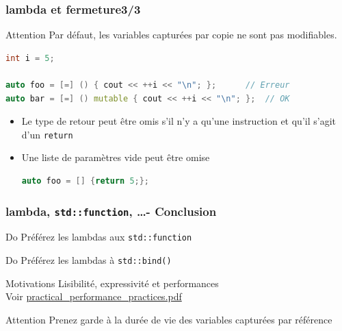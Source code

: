 \documentclass[C++.tex]{subfiles}
\begin{document}
\begin{frame}[fragile]
	\frametitle{lambda et fermeture\titlehfill{}3/3}
	\begin{alertblock}{Attention}
		Par défaut, les variables capturées par copie ne sont pas modifiables.

		\begin{lstlisting}[language=C++]
int i = 5;

auto foo = [=] () { cout << ++i << "\n"; };      // Erreur
auto bar = [=] () mutable { cout << ++i << "\n"; };  // OK\end{lstlisting}

	\end{alertblock}

	\begin{itemize}
		\item Le type de retour peut être omis s'il n'y a qu'une instruction et qu'il s'agit d'un \lstinline|return|
	
	
		\item Une liste de paramètres vide peut être omise


\begin{lstlisting}[language=C++]
auto foo = [] {return 5;};\end{lstlisting}
	\end{itemize}
\end{frame}

\begin{frame}[fragile]
	\frametitle{lambda, \lstinline|std::function|, \ldots - Conclusion}
	\begin{exampleblock}{Do}
		Préférez les lambdas aux \lstinline|std::function|
	\end{exampleblock}

	\begin{exampleblock}{Do}
		Préférez les lambdas à \lstinline|std::bind()|
	\end{exampleblock}


	\begin{block}{Motivations}
		Lisibilité, expressivité et performances \\
		Voir \href{https://github.com/boostcon/cppnow_presentations_2016/blob/master/00_tuesday/practical_performance_practices.pdf}{practical\_performance\_practices.pdf}

	\end{block}

	\begin{alertblock}{Attention}
		Prenez garde à la durée de vie des variables capturées par référence
	\end{alertblock}
\end{frame}
\end{document}
